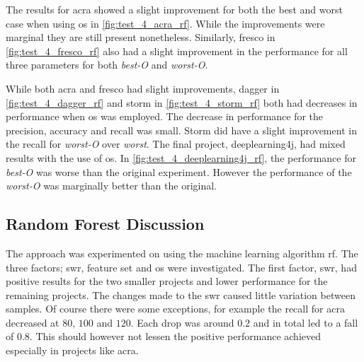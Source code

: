 The results for acra showed a slight improvement for both the best and worst case when using \gls{os} in \autoref{fig:test_4_acra_rf}. While the improvements were marginal they are still present nonetheless. Similarly, fresco in \autoref{fig:test_4_fresco_rf} also had a slight improvement in the performance for all three parameters for both \textit{best-O} and \textit{worst-O}.

While both acra and fresco had slight improvements, dagger in \autoref{fig:test_4_dagger_rf} and storm in \autoref{fig:test_4_storm_rf} both had decreases in performance when \gls{os} was employed. The decrease in performance for the precision, accuracy and recall was small. Storm did have a slight improvement in the recall for \textit{worst-O} over \textit{worst}. The final project, deeplearning4j, had mixed results with the use of \gls{os}. In \autoref{fig:test_4_deeplearning4j_rf}, the performance for \textit{best-O} was worse than the original experiment. However the performance of the \textit{worst-O} was marginally better than the original.

\subsection{Random Forest Discussion}
\label{subsec:rf_discussion}

The approach was experimented on using the machine learning algorithm \gls{rf}. The three factors; \gls{swr}, feature set and \gls{os} were investigated. The first factor, \gls{swr}, had positive results for the two smaller projects and lower performance for the remaining projects. The changes made to the \gls{swr} caused little variation between samples. Of course there were some exceptions, for example the recall for acra decreased at $80$, $100$ and $120$. Each drop was around $0.2$ and in total led to a fall of $0.8$. This should however not lessen the positive performance achieved especially in projects like acra.

